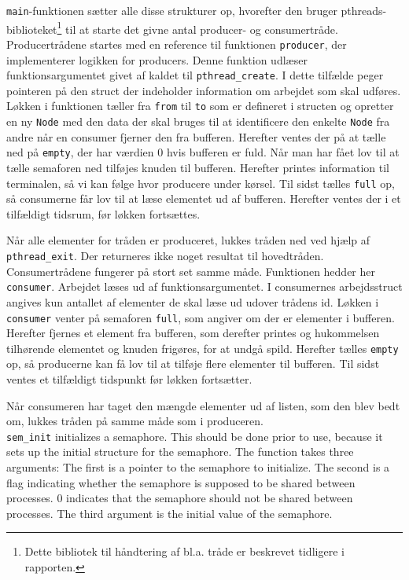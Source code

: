 \texttt{main}-funktionen sætter alle disse strukturer op, hvorefter den bruger pthreads-biblioteket\footnote{Dette bibliotek til håndtering af bl.a. tråde er beskrevet tidligere i rapporten.} til at starte det givne antal producer- og consumertråde.\\

Producertrådene startes med en reference til funktionen \texttt{producer}, der implementerer logikken for producers. Denne funktion udlæser funktionsargumentet givet af kaldet til \texttt{pthread\_create}. I dette tilfælde peger pointeren på den struct der indeholder information om arbejdet som skal udføres. Løkken i funktionen tæller fra \texttt{from} til \texttt{to} som er defineret i structen og opretter en ny \texttt{Node} med den data der skal bruges til at identificere den enkelte \texttt{Node} fra andre når en consumer fjerner den fra bufferen. Herefter ventes der på at tælle ned på \texttt{empty}, der har værdien 0 hvis bufferen er fuld. Når man har fået lov til at tælle semaforen ned tilføjes knuden til bufferen. Herefter printes information til terminalen, så vi kan følge hvor producere under kørsel. Til sidst tælles \texttt{full} op, så consumerne får lov til at læse elementet ud af bufferen. Herefter ventes der i et tilfældigt tidsrum, før løkken fortsættes.

Når alle elementer for tråden er produceret, lukkes tråden ned ved hjælp af \texttt{pthread\_exit}. Der returneres ikke noget resultat til hovedtråden.\\

Consumertrådene fungerer på stort set samme måde. Funktionen hedder her \texttt{consumer}. Arbejdet læses ud af funktionsargumentet. I consumernes arbejdsstruct angives kun antallet af elementer de skal læse ud udover trådens id. Løkken i \texttt{consumer} venter på semaforen \texttt{full}, som angiver om der er elementer i bufferen. Herefter fjernes et element fra bufferen, som derefter printes og hukommelsen tilhørende elementet og knuden frigøres, for at undgå spild. Herefter tælles \texttt{empty} op, så producerne kan få lov til at tilføje flere elementer til bufferen. Til sidst ventes et tilfældigt tidspunkt før løkken fortsætter.

Når consumeren har taget den mængde elementer ud af listen, som den blev bedt om, lukkes tråden på samme måde som i produceren.\\

\texttt{sem\_init} initializes a semaphore. This should be done prior to use, because it sets up the initial structure for the semaphore. The function takes three arguments: The first is a pointer to the semaphore to initialize. The second is a flag indicating whether the semaphore is supposed to be shared between processes. 0 indicates that the semaphore should not be shared between processes. The third argument is the initial value of the semaphore.\\

